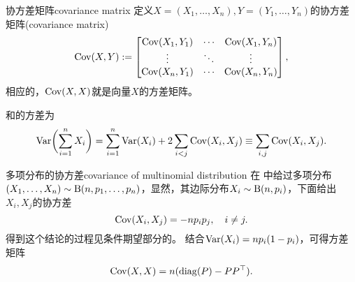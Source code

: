 \begin{definition}{协方差矩阵}{covariance matrix}
	定义$X=(X_1,\ldots,X_n),Y=(Y_1,\ldots,Y_n)$的协方差矩阵(covariance matrix)
	\begin{equation}
		\operatorname{Cov}(X,Y):=\begin{bmatrix}
			\operatorname{Cov}(X_1,Y_1)&\cdots&\operatorname{Cov}(X_1,Y_n)\\
			\vdots&\ddots&\vdots\\
			\operatorname{Cov}(X_n,Y_1)&\cdots&\operatorname{Cov}(X_n,Y_n)
		\end{bmatrix},
	\end{equation}
	相应的，$\operatorname{Cov}(X,X)$就是向量$X$的方差矩阵。
\end{definition}
\begin{corollary}
	和的方差为
	\begin{equation}
		\operatorname{Var}\biggl(\sum_{i=1}^nX_i\biggr)=\sum_{i=1}^n\operatorname{Var}(X_i)+2\sum_{i<j}\operatorname{Cov}(X_i,X_j)\equiv\sum_{i,j}\operatorname{Cov}(X_i,X_j).
	\end{equation}
\end{corollary}
\begin{example}{多项分布的协方差}{covariance of multinomial distribution}
	在 中给过多项分布$(X_1,\ldots,X_n)\sim\operatorname{B}(n,p_1,\ldots,p_n)$，显然，其边际分布$X_i\sim\operatorname{B}(n,p_i)$，下面给出$X_i,X_j$的协方差
	\begin{equation}
		\operatorname{Cov}(X_i,X_j)=-np_ip_j,\quad i\neq j.
	\end{equation}
	得到这个结论的过程见条件期望部分的。
	结合$\operatorname{Var}(X_i)=np_i(1-p_i)$，可得方差矩阵
	\begin{equation}
		\operatorname{Cov}(X,X)=n(\operatorname{diag}(P)-PP^\top).
	\end{equation}
\end{example}
